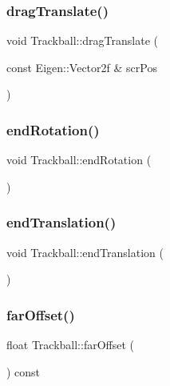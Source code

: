 \mbox{\label{class_trackball_ab4271070a39f9c771b526e9e0116894e}} 
\subsubsection{\texorpdfstring{drag\+Translate()}{dragTranslate()}}
{\footnotesize\ttfamily void Trackball\+::drag\+Translate (\begin{DoxyParamCaption}\item[{const Eigen\+::\+Vector2f \&}]{scr\+Pos }\end{DoxyParamCaption})}

\mbox{\label{class_trackball_a1d2f2f29955059d93bb64fe5f83b0afc}} 
\subsubsection{\texorpdfstring{end\+Rotation()}{endRotation()}}
{\footnotesize\ttfamily void Trackball\+::end\+Rotation (\begin{DoxyParamCaption}{ }\end{DoxyParamCaption})}

\mbox{\label{class_trackball_ae8ba33700d707ed2621f39bc8fbd3686}} 
\subsubsection{\texorpdfstring{end\+Translation()}{endTranslation()}}
{\footnotesize\ttfamily void Trackball\+::end\+Translation (\begin{DoxyParamCaption}{ }\end{DoxyParamCaption})}

\mbox{\label{class_trackball_ab674f03c640a2f3d434afc4bcad241c9}} 
\subsubsection{\texorpdfstring{far\+Offset()}{farOffset()}}
{\footnotesize\ttfamily float Trackball\+::far\+Offset (\begin{DoxyParamCaption}{ }\end{DoxyParamCaption}) const}

